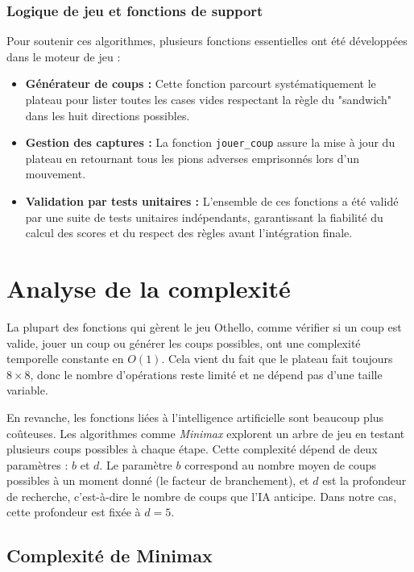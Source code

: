 \documentclass{article}
\begin{document}
\subsubsection{Logique de jeu et fonctions de support}

Pour soutenir ces algorithmes, plusieurs fonctions essentielles ont été développées dans le moteur de jeu :
\begin{itemize}
    \item \textbf{Générateur de coups :} Cette fonction parcourt systématiquement le plateau pour lister toutes les cases vides respectant la règle du "sandwich" dans les huit directions possibles.
    \item \textbf{Gestion des captures :} La fonction \texttt{jouer\_coup} assure la mise à jour du plateau en retournant tous les pions adverses emprisonnés lors d'un mouvement.
    \item \textbf{Validation par tests unitaires :} L'ensemble de ces fonctions a été validé par une suite de tests unitaires indépendants, garantissant la fiabilité du calcul des scores et du respect des règles avant l'intégration finale.
\end{itemize}

\section{\textbf{Analyse de la complexité}}

La plupart des fonctions qui gèrent le jeu Othello, comme vérifier si un coup est valide, jouer un coup ou générer les coups possibles, ont une complexité temporelle constante en $O(1)$. Cela vient du fait que le plateau fait toujours $8 \times 8$, donc le nombre d'opérations reste limité et ne dépend pas d'une taille variable.

En revanche, les fonctions liées à l'intelligence artificielle sont beaucoup plus coûteuses. Les algorithmes comme \emph{Minimax} explorent un arbre de jeu en testant plusieurs coups possibles à chaque étape. Cette complexité dépend de deux paramètres : $b$ et $d$. Le paramètre $b$ correspond au nombre moyen de coups possibles à un moment donné (le facteur de branchement), et $d$ est la profondeur de recherche, c'est-à-dire le nombre de coups que l'IA anticipe. Dans notre cas, cette profondeur est fixée à $d = 5$.

\subsection*{Complexité de Minimax}
\end{document}
